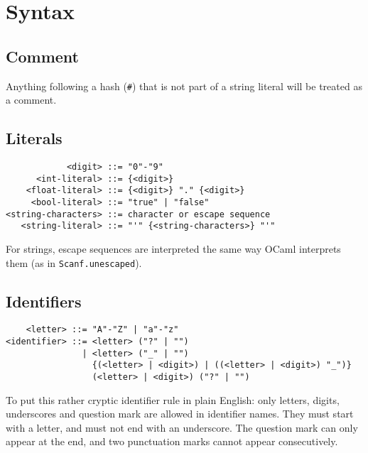 \section{Syntax}

\subsection{Comment}
Anything following a hash (\verb|#|) that is not part of a string literal will be treated as a
comment.

\subsection{Literals}
\begin{verbatim}
            <digit> ::= "0"-"9"
      <int-literal> ::= {<digit>}
    <float-literal> ::= {<digit>} "." {<digit>}
     <bool-literal> ::= "true" | "false"
<string-characters> ::= character or escape sequence
   <string-literal> ::= "'" {<string-characters>} "'"
\end{verbatim}

For strings, escape sequences are interpreted the same way OCaml interprets them (as in
\verb|Scanf.unescaped|).

\subsection{Identifiers}
\begin{verbatim}
    <letter> ::= "A"-"Z" | "a"-"z"
<identifier> ::= <letter> ("?" | "")
               | <letter> ("_" | "")
                 {(<letter> | <digit>) | ((<letter> | <digit>) "_")}
                 (<letter> | <digit>) ("?" | "")
\end{verbatim}

To put this rather cryptic identifier rule in plain English: only letters, digits, underscores and
question mark are allowed in identifier names. They must start with a letter, and must not end with
an underscore. The question mark can only appear at the end, and two punctuation marks cannot appear
consecutively.

